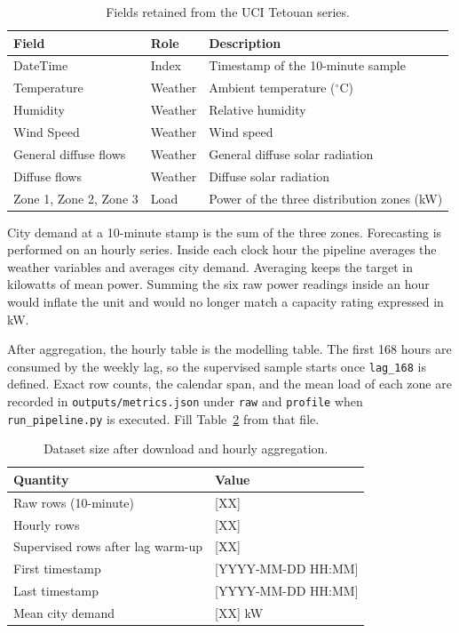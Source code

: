 \begin{table}[h]
  \centering
  \small
  \begin{tabular}{@{}llp{7.2cm}@{}}
    \toprule
    Field & Role & Description \\
    \midrule
    DateTime & Index & Timestamp of the 10-minute sample \\
    Temperature & Weather & Ambient temperature (\(^\circ\mathrm{C}\)) \\
    Humidity & Weather & Relative humidity \\
    Wind Speed & Weather & Wind speed \\
    General diffuse flows & Weather & General diffuse solar radiation \\
    Diffuse flows & Weather & Diffuse solar radiation \\
    Zone 1, Zone 2, Zone 3 & Load & Power of the three distribution zones (kW) \\
    \bottomrule
  \end{tabular}
  \caption{Fields retained from the UCI Tetouan series.}
  \label{tab:columns}
\end{table}

City demand at a 10-minute stamp is the sum of the three zones. Forecasting
is performed on an hourly series. Inside each clock hour the pipeline averages
the weather variables and averages city demand. Averaging keeps the target in
kilowatts of mean power. Summing the six raw power readings inside an hour
would inflate the unit and would no longer match a capacity rating expressed
in kW.

After aggregation, the hourly table is the modelling table. The first 168
hours are consumed by the weekly lag, so the supervised sample starts once
\texttt{lag\_168} is defined. Exact row counts, the calendar span, and the
mean load of each zone are recorded in \texttt{outputs/metrics.json} under
\texttt{raw} and \texttt{profile} when \texttt{run\_pipeline.py} is executed.
Fill Table~\ref{tab:dataset-size} from that file.

\begin{table}[h]
  \centering
  \small
  \begin{tabular}{@{}ll@{}}
    \toprule
    Quantity & Value \\
    \midrule
    Raw rows (10-minute) & [XX] \\
    Hourly rows & [XX] \\
    Supervised rows after lag warm-up & [XX] \\
    First timestamp & [YYYY-MM-DD HH:MM] \\
    Last timestamp & [YYYY-MM-DD HH:MM] \\
    Mean city demand & [XX] kW \\
    \bottomrule
  \end{tabular}
  \caption{Dataset size after download and hourly aggregation.}
  \label{tab:dataset-size}
\end{table}

